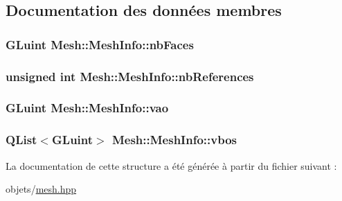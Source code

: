 \subsection{Documentation des données membres}
\hypertarget{struct_mesh_1_1_mesh_info_a6c5d4c62798c18f998550cc288f9ca91}{
\subsubsection[{nb\+Faces}]{\setlength{\rightskip}{0pt plus 5cm}G\+Luint Mesh\+::\+Mesh\+Info\+::nb\+Faces}}\label{struct_mesh_1_1_mesh_info_a6c5d4c62798c18f998550cc288f9ca91}
\hypertarget{struct_mesh_1_1_mesh_info_a8e32fc200e5ed8af32c409cac7b17342}{
\subsubsection[{nb\+References}]{\setlength{\rightskip}{0pt plus 5cm}unsigned int Mesh\+::\+Mesh\+Info\+::nb\+References}}\label{struct_mesh_1_1_mesh_info_a8e32fc200e5ed8af32c409cac7b17342}
\hypertarget{struct_mesh_1_1_mesh_info_af15096e0f0aa61fff7d8a1c223e547cf}{
\subsubsection[{vao}]{\setlength{\rightskip}{0pt plus 5cm}G\+Luint Mesh\+::\+Mesh\+Info\+::vao}}\label{struct_mesh_1_1_mesh_info_af15096e0f0aa61fff7d8a1c223e547cf}
\hypertarget{struct_mesh_1_1_mesh_info_ad360b326ff7424dc9b6a3f6614af895d}{
\subsubsection[{vbos}]{\setlength{\rightskip}{0pt plus 5cm}Q\+List$<$G\+Luint$>$ Mesh\+::\+Mesh\+Info\+::vbos}}\label{struct_mesh_1_1_mesh_info_ad360b326ff7424dc9b6a3f6614af895d}


La documentation de cette structure a été générée à partir du fichier suivant \+:\begin{DoxyCompactItemize}
\item 
objets/\hyperlink{mesh_8hpp}{mesh.\+hpp}\end{DoxyCompactItemize}
